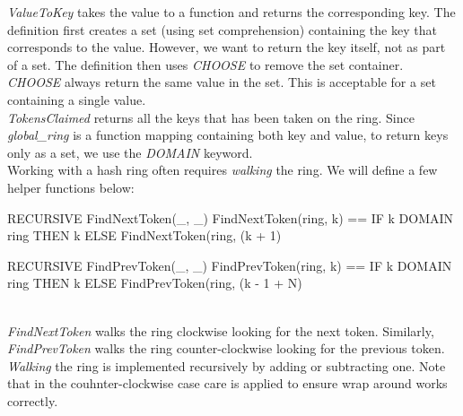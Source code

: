 \textit{ValueToKey} takes the value to a function and returns the corresponding
key. The definition first creates a set (using set comprehension) containing the
key that corresponds to the value. However, we want to return the key itself,
not as part of a set. The definition then uses \textit{CHOOSE} to remove the set
container. \textit{CHOOSE} always return the same value in the set. This is
acceptable for a set containing a single value.\\

\textit{TokensClaimed} returns all the keys that has been taken on the ring. Since
\textit{global\_ring} is a function mapping containing both key and value, to
return keys only as a set, we use the \textit{DOMAIN} keyword.\\

Working with a hash ring often requires \textit{walking} the ring. We will
define a few helper functions below:\\

\begin{tla}
RECURSIVE FindNextToken(_, _)
FindNextToken(ring, k) ==
    IF k \in DOMAIN ring THEN
        k 
    ELSE 
        FindNextToken(ring, (k + 1) %

RECURSIVE FindPrevToken(_, _)
FindPrevToken(ring, k) ==
    IF k \in DOMAIN ring THEN
        k
    ELSE 
        FindPrevToken(ring, (k - 1 + N) %
\end{tla}
\begin{tlatex}
%
%
%
%
%
%
\@pvspace{8.0pt}%
%
%
%
%
%
%
\end{tlatex}
\\

\textit{FindNextToken} walks the ring clockwise looking for the next token.
Similarly, \textit{FindPrevToken} walks the ring counter-clockwise looking for the
previous token. \textit{Walking} the ring is implemented recursively by adding or 
subtracting one. Note that in the couhnter-clockwise case care is applied to
ensure wrap around works correctly.\\

